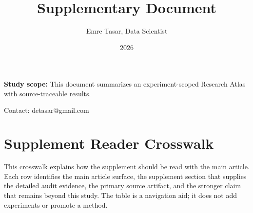 \documentclass[11pt]{article}
\title{Supplementary Document}
\author{Emre Tasar, Data Scientist}
\date{2026}
\begin{document}
\maketitle
\noindent\textbf{Study scope:} This document summarizes an experiment-scoped Research Atlas with source-traceable results.

Contact: detasar@gmail.com

\section{Supplement Reader Crosswalk}

This crosswalk explains how the supplement should be read with the main article. Each row identifies the main article surface, the supplement section that supplies the detailed audit evidence, the primary source artifact, and the stronger claim that remains beyond this study. The table is a navigation aid; it does not add experiments or promote a method.
\end{document}
